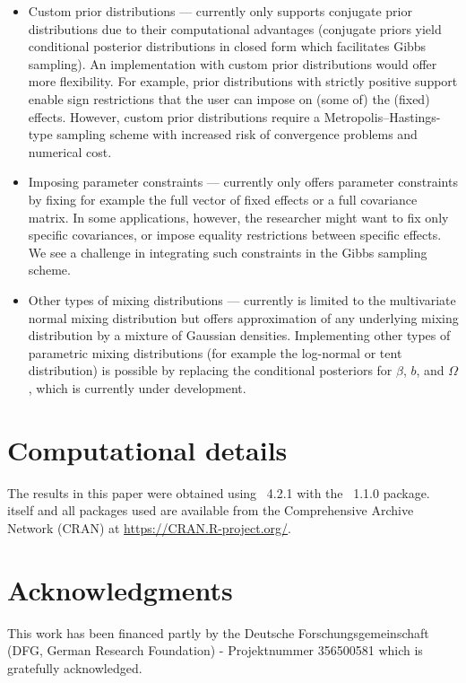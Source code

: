 \documentclass[article,shortnames]{jss}
\begin{document}
\begin{itemize}
  \item Custom prior distributions ---  currently only supports conjugate prior distributions due to their computational advantages (conjugate priors yield conditional posterior distributions in closed form which facilitates Gibbs sampling). An implementation with custom prior distributions would offer more flexibility. For example, prior distributions with strictly positive support enable sign restrictions that the user can impose on (some of) the (fixed) effects. However, custom prior distributions require a Metropolis–Hastings-type sampling scheme with increased risk of convergence problems and numerical cost.
  \item Imposing parameter constraints ---  currently only offers parameter constraints by fixing for example the full vector of fixed effects or a full covariance matrix. In some applications, however, the researcher might want to fix only specific covariances, or impose equality restrictions between specific effects. We see a challenge in integrating such constraints in the Gibbs sampling scheme.
  \item Other types of mixing distributions ---  currently is limited to the multivariate normal mixing distribution but offers approximation of any underlying mixing distribution by a mixture of Gaussian densities. Implementing other types of parametric mixing distributions (for example the log-normal or tent distribution) is possible by replacing the conditional posteriors for $\beta$, $b$, and $\Omega$, which is currently under development.
\end{itemize}

\section*{Computational details}

The results in this paper were obtained using
~4.2.1 with the
~1.1.0 package.  itself
and all packages used are available from the Comprehensive
 Archive Network (CRAN) at \url{https://CRAN.R-project.org/}.


\section*{Acknowledgments}

This work has been financed partly by the Deutsche Forschungsgemeinschaft (DFG, German Research Foundation) - Projektnummer 356500581 which is gratefully acknowledged.


\end{document}
